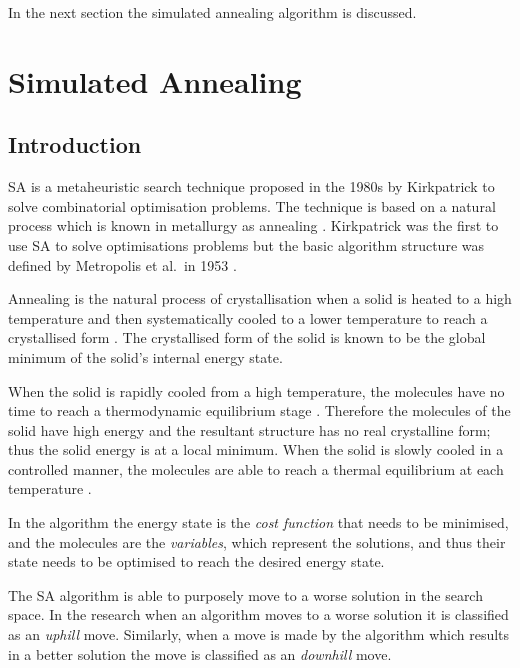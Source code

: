 In the next section the simulated annealing algorithm is discussed.
\section{Simulated Annealing}
\label{sec:simulatedannealing}

\subsection{Introduction}
\label{sec:SAIntroduction}
\gls{SA} is a metaheuristic search technique proposed in the 1980s by Kirkpatrick to solve combinatorial optimisation problems. The technique is based on a natural process which is known in metallurgy as annealing \cite{SASingleMultiObj,TempCyclingSA}. Kirkpatrick was the first to use \gls{SA} to solve optimisations problems but the basic algorithm structure was defined by Metropolis et al.\ in 1953 \cite{CurveFittingSA,VeryFastSAImageEnchancement}.

Annealing is the natural process of crystallisation when a solid is heated to a high temperature and then systematically cooled to a lower temperature to reach a crystallised form \cite{NewSAs,ConstantTempSA}. The crystallised form of the solid is known to be the global minimum of the solid's internal energy state. 

When the solid is rapidly cooled from a high temperature, the molecules have no time to reach a thermodynamic equilibrium stage \cite{MobileRobotSA,ConstantTempSA}. Therefore the molecules of the solid have high energy and the resultant structure has no real crystalline form; thus the solid energy is at a local minimum\cite{CurveFittingSA,NewSAs,MobileRobotSA}. When the solid is slowly cooled in a controlled manner, the molecules are able to reach a thermal equilibrium at each temperature \cite{ChaosSA,CurveFittingSA,NewSAs}.

In the algorithm the energy state is the \emph{cost function} that needs to be minimised, and the molecules are the \emph{variables}, which represent the solutions, and thus their state needs to be optimised to reach the desired energy state.

The \gls{SA} algorithm is able to purposely move to a worse solution in the search space\cite{EcoEquilSA}. In the research when an algorithm moves to a worse solution it is classified as an \emph{uphill} move\cite{AIModernApproach}. Similarly, when a move is made by the algorithm which results in a better solution the move is classified as an \emph{downhill} move\cite{AIModernApproach}.

